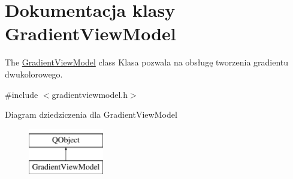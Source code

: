 \hypertarget{class_gradient_view_model}{}\section{Dokumentacja klasy Gradient\+View\+Model}
\label{class_gradient_view_model}


The \mbox{\hyperlink{class_gradient_view_model}{Gradient\+View\+Model}} class Klasa pozwala na obsługę tworzenia gradientu dwukolorowego.  




{\ttfamily \#include $<$gradientviewmodel.\+h$>$}

Diagram dziedziczenia dla Gradient\+View\+Model\begin{figure}[H]
\begin{center}
\leavevmode
\includegraphics[height=2.000000cm]{class_gradient_view_model}
\end{center}
\end{figure}
